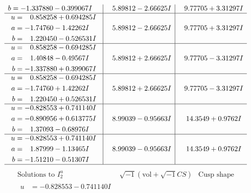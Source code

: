 \documentclass[1p]{elsarticle_modified}
\theoremstyle{definition}
\newcommand{\I}{\sqrt{-1}}
\begin{document}
$$\begin{array}{c|c|c}
\begin{aligned}
b &= -1.337880 - 0.399067 I\end{aligned}
 & \phantom{-}5.89812 - 2.66625 I & \phantom{-}9.77705 + 3.31297 I \\ \hline\begin{aligned}
u &= \phantom{-}0.858258 + 0.694285 I \\
a &= -1.74760 - 1.42262 I \\
b &= \phantom{-}1.220450 - 0.526531 I\end{aligned}
 & \phantom{-}5.89812 - 2.66625 I & \phantom{-}9.77705 + 3.31297 I \\ \hline\begin{aligned}
u &= \phantom{-}0.858258 - 0.694285 I \\
a &= \phantom{-}1.40848 - 0.49567 I \\
b &= -1.337880 + 0.399067 I\end{aligned}
 & \phantom{-}5.89812 + 2.66625 I & \phantom{-}9.77705 - 3.31297 I \\ \hline\begin{aligned}
u &= \phantom{-}0.858258 - 0.694285 I \\
a &= -1.74760 + 1.42262 I \\
b &= \phantom{-}1.220450 + 0.526531 I\end{aligned}
 & \phantom{-}5.89812 + 2.66625 I & \phantom{-}9.77705 - 3.31297 I \\ \hline\begin{aligned}
u &= -0.828553 + 0.741140 I \\
a &= -0.890956 + 0.613775 I \\
b &= \phantom{-}1.37093 - 0.68976 I\end{aligned}
 & \phantom{-}8.99039 - 0.95663 I & \phantom{-}14.3549 + 0.9762 I \\ \hline\begin{aligned}
u &= -0.828553 + 0.741140 I \\
a &= \phantom{-}1.87999 - 1.13465 I \\
b &= -1.51210 - 0.51307 I\end{aligned}
 & \phantom{-}8.99039 - 0.95663 I & \phantom{-}14.3549 + 0.9762 I\\
 \hline 
 \end{array}$$\newpage$$\begin{array}{c|c|c}  
\text{Solutions to }I^u_{2}& \I (\text{vol} + \sqrt{-1}CS) & \text{Cusp shape}\\
 \hline 
\begin{aligned}
u &= -0.828553 - 0.741140 I \\

\end{aligned}
\end{array}$$
\end{document}
